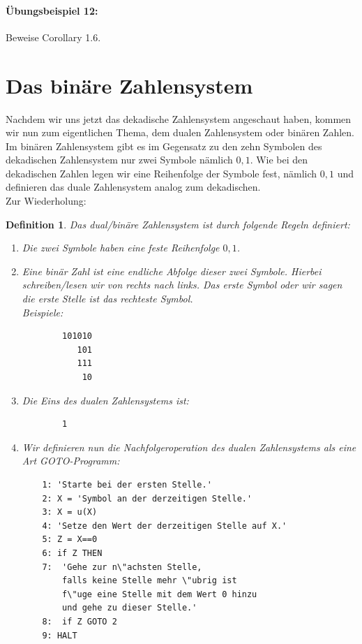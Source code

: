 \documentclass[11pt,a4paper,leqno]{report}
\newtheorem{definition}[theorem]{Definition}
\numberwithin{equation}{chapter}
\begin{document}
\paragraph{\"Ubungsbeispiel 12:} Beweise Corollary 1.6.
\section{Das bin\"are Zahlensystem}
Nachdem wir uns jetzt das dekadische Zahlensystem angeschaut haben, kommen wir nun zum eigentlichen Thema, dem dualen Zahlensystem oder bin\"aren Zahlen. Im bin\"aren Zahlensystem gibt es im Gegensatz zu den zehn Symbolen des dekadischen Zahlensystem nur zwei Symbole n\"amlich ${0, 1}$. Wie bei den dekadischen Zahlen legen wir eine Reihenfolge der Symbole fest, n\"amlich $0, 1$ und definieren das duale Zahlensystem analog zum dekadischen.\\
Zur Wiederholung: 
\begin{definition}
	Das dual/bin\"are Zahlensystem ist durch folgende Regeln definiert:
	\begin{enumerate}
		\item Die zwei Symbole haben eine feste Reihenfolge $0, 1$.
		\item Eine bin\"ar Zahl ist eine endliche Abfolge dieser zwei Symbole. Hierbei schreiben/lesen wir von rechts nach links. Das erste Symbol oder wir sagen die erste Stelle ist das rechteste Symbol. \\Beispiele:
		\begin{lstlisting}
		101010
		   101
		   111
		    10
		\end{lstlisting}
		\item Die Eins des dualen Zahlensystems ist:
		\begin{lstlisting}
		1
		\end{lstlisting}
		\item Wir definieren nun die Nachfolgeroperation des dualen Zahlensystems als eine Art GOTO-Programm:
			\begin{lstlisting}
	1: 'Starte bei der ersten Stelle.'
	2: X = 'Symbol an der derzeitigen Stelle.'
	3: X = u(X)
	4: 'Setze den Wert der derzeitigen Stelle auf X.'
	5: Z = X==0
	6: if Z THEN
	7: 	'Gehe zur n\"achsten Stelle, 
		falls keine Stelle mehr \"ubrig ist 
		f\"uge eine Stelle mit dem Wert 0 hinzu
		und gehe zu dieser Stelle.'
	8:	if Z GOTO 2
	9: HALT
			\end{lstlisting}
	\end{enumerate}
\end{definition}
\end{document}
